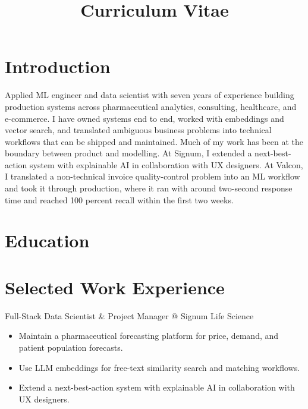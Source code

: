 \documentclass[11pt,a4paper]{moderncv}
\title{Curriculum Vitae}
\begin{document}
\makecvtitle

\section*{Introduction}
Applied ML engineer and data scientist with seven years of experience building production systems across pharmaceutical analytics, consulting, healthcare, and e-commerce. I have owned systems end to end, worked with embeddings and vector search, and translated ambiguous business problems into technical workflows that can be shipped and maintained.
\newline\hspace*{2em}
Much of my work has been at the boundary between product and modelling. At Signum, I extended a next-best-action system with explainable AI in collaboration with UX designers. At Valcon, I translated a non-technical invoice quality-control problem into an ML workflow and took it through production, where it ran with around two-second response time and reached 100 percent recall within the first two weeks.

\section{Education}




\section{Selected Work Experience}

\large{Full-Stack Data Scientist \& Project Manager @ Signum Life Science}
\normalsize
\begin{itemize}
\item Maintain a pharmaceutical forecasting platform for price, demand, and patient population forecasts.
\item Use LLM embeddings for free-text similarity search and matching workflows.
\item Extend a next-best-action system with explainable AI in collaboration with UX designers.
\end{itemize}
\end{document}
